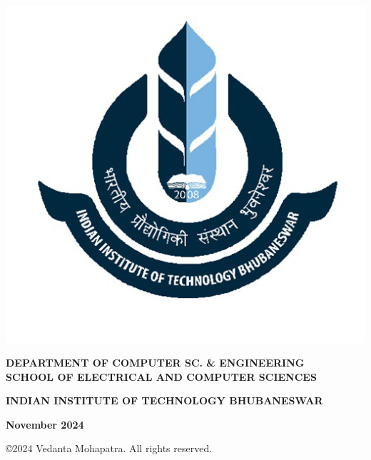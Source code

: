 \begin{titlepage}
\begin{center}
\includegraphics[scale=0.3]{iitbbs}
\end{center}
 \vspace{-1em}
\begin{center}
 \textbf{\small DEPARTMENT OF COMPUTER SC. \& ENGINEERING} \\
 \textbf{\small SCHOOL OF ELECTRICAL AND COMPUTER SCIENCES}
\end{center}
 \vspace{-3em}
\begin{center}
 \textbf{\small INDIAN INSTITUTE OF TECHNOLOGY BHUBANESWAR} 
\end{center}
 \vspace{-3em}
\begin{center}
 \textbf{November 2024}
\end{center}
 \vspace{-3em}
\begin{center}
 \copyright 2024 Vedanta Mohapatra. All rights reserved.
\end{center}
\cleardoublepage

\end{titlepage}

